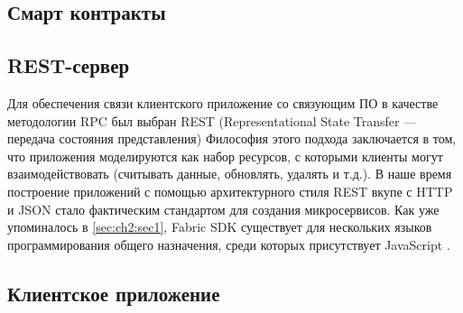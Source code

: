 \subsection{Смарт контракты} \label{subsec:ch2/sec2/subsec2}

 
\subsection{REST-сервер} \label{subsec:ch2/sec2/subsec3}
Для обеспечения связи клиентского приложение со связующим ПО в качестве методологии RPC был выбран REST (Representational State Transfer — передача состояния представления)\cite{restful} Философия этого подхода заключается в том, что приложения моделируются как набор ресурсов, с которыми клиенты могут взаимодействовать (считывать данные, обновлять, удалять и т.д.). В наше время построение приложений с помощью архитектурного стиля REST вкупе с HTTP и JSON \cite{js-json} стало фактическим стандартом для создания микросервисов.
Как уже упоминалось в \ref{sec:ch2:sec1}, Fabric SDK существует для нескольких языков программирования общего назначения, среди которых присутствует JavaScript \cite{pure-js}. 

\subsection{Клиентское приложение}
 \label{subsec:ch2/sec2/subsec3}
 
